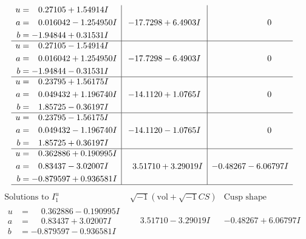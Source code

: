 \documentclass[1p]{elsarticle_modified}
\theoremstyle{definition}
\newcommand{\I}{\sqrt{-1}}
\begin{document}
$$\begin{array}{c|c|c}
\begin{aligned}
u &= \phantom{-}0.27105 + 1.54914 I \\
a &= \phantom{-}0.016042 - 1.254950 I \\
b &= -1.94844 + 0.31531 I\end{aligned}
 & -17.7298 + 6.4903 I & \phantom{-0.000000 } 0 \\ \hline\begin{aligned}
u &= \phantom{-}0.27105 - 1.54914 I \\
a &= \phantom{-}0.016042 + 1.254950 I \\
b &= -1.94844 - 0.31531 I\end{aligned}
 & -17.7298 - 6.4903 I & \phantom{-0.000000 } 0 \\ \hline\begin{aligned}
u &= \phantom{-}0.23795 + 1.56175 I \\
a &= \phantom{-}0.049432 + 1.196740 I \\
b &= \phantom{-}1.85725 - 0.36197 I\end{aligned}
 & -14.1120 + 1.0765 I & \phantom{-0.000000 } 0 \\ \hline\begin{aligned}
u &= \phantom{-}0.23795 - 1.56175 I \\
a &= \phantom{-}0.049432 - 1.196740 I \\
b &= \phantom{-}1.85725 + 0.36197 I\end{aligned}
 & -14.1120 - 1.0765 I & \phantom{-0.000000 } 0 \\ \hline\begin{aligned}
u &= \phantom{-}0.362886 + 0.190995 I \\
a &= \phantom{-}0.83437 - 3.02007 I \\
b &= -0.879597 + 0.936581 I\end{aligned}
 & \phantom{-}3.51710 + 3.29019 I & -0.48267 - 6.06797 I\\
 \hline 
 \end{array}$$\newpage$$\begin{array}{c|c|c}  
\text{Solutions to }I^u_{1}& \I (\text{vol} + \sqrt{-1}CS) & \text{Cusp shape}\\
 \hline 
\begin{aligned}
u &= \phantom{-}0.362886 - 0.190995 I \\
a &= \phantom{-}0.83437 + 3.02007 I \\
b &= -0.879597 - 0.936581 I\end{aligned}
 & \phantom{-}3.51710 - 3.29019 I & -0.48267 + 6.06797 I \\ \hline\begin{aligned}

\end{aligned}
\end{array}$$
\end{document}
